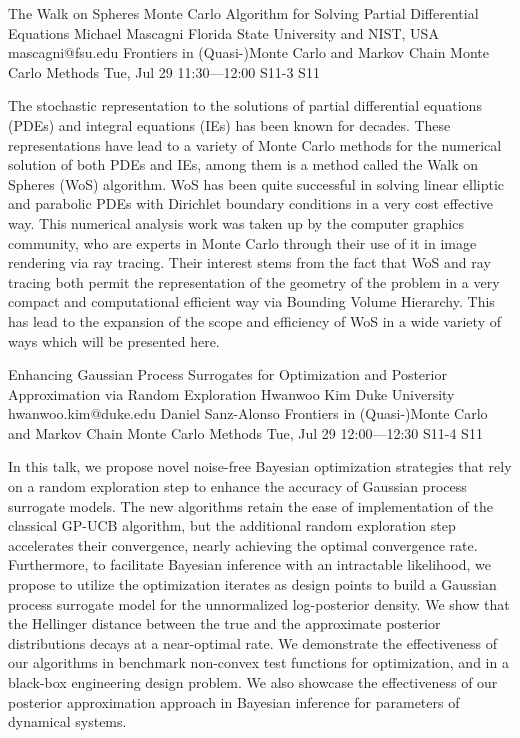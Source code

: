 \begin{talk}
  {The Walk on Spheres Monte Carlo Algorithm for Solving Partial Differential Equations}%
  {Michael Mascagni}%
  {Florida State University and NIST, USA}%
  {mascagni@fsu.edu}%
  {Frontiers in (Quasi-)Monte Carlo and Markov Chain Monte Carlo Methods}%
  {}%
  {Tue, Jul 29 11:30---12:00}%
  {S11-3}%
  {S11}%
    
   
The stochastic representation to the solutions of partial differential equations (PDEs) and integral equations (IEs) has been known for decades.  These representations have lead to a variety of Monte Carlo methods for the numerical solution of both PDEs and IEs, among them is a method called the Walk on Spheres (WoS) algorithm.  WoS has been quite successful in solving linear elliptic and parabolic PDEs with Dirichlet boundary conditions in a very cost effective way.  This numerical analysis work was taken up by the computer graphics community, who are experts in Monte Carlo through their use of it in image rendering via ray tracing.  Their interest stems from the fact that WoS and ray tracing both permit the representation of the geometry of the problem in a very compact and computational efficient way via Bounding Volume Hierarchy.  This has lead to the expansion of the scope and efficiency of WoS in a wide variety of ways which will be presented here.
\end{talk}

\begin{talk}
  {Enhancing Gaussian Process Surrogates for Optimization and Posterior Approximation via Random Exploration}%
  {Hwanwoo Kim}%
  {Duke University}%
  {hwanwoo.kim@duke.edu}%
  {Daniel Sanz-Alonso}%
  {Frontiers in (Quasi-)Monte Carlo and Markov Chain Monte Carlo Methods}%
  {Tue, Jul 29 12:00---12:30}%
  {S11-4}%
  {S11}%
    
   
In this talk, we propose novel noise-free Bayesian optimization strategies that rely on a random exploration step to enhance the accuracy of Gaussian process surrogate models. The new algorithms retain the ease of implementation of the classical GP-UCB algorithm, but the additional random exploration step accelerates their convergence, nearly achieving the optimal convergence rate. Furthermore, to facilitate Bayesian inference with an intractable likelihood, we propose to utilize the optimization iterates as design points to build a Gaussian process surrogate model for the unnormalized log-posterior density. We show that the Hellinger distance between the true and the approximate posterior distributions decays at a near-optimal rate. We demonstrate the effectiveness of our algorithms in benchmark non-convex test functions for optimization, and in a black-box engineering design problem. We also showcase the effectiveness of our posterior approximation approach in Bayesian inference for parameters of dynamical systems.


\end{talk}

